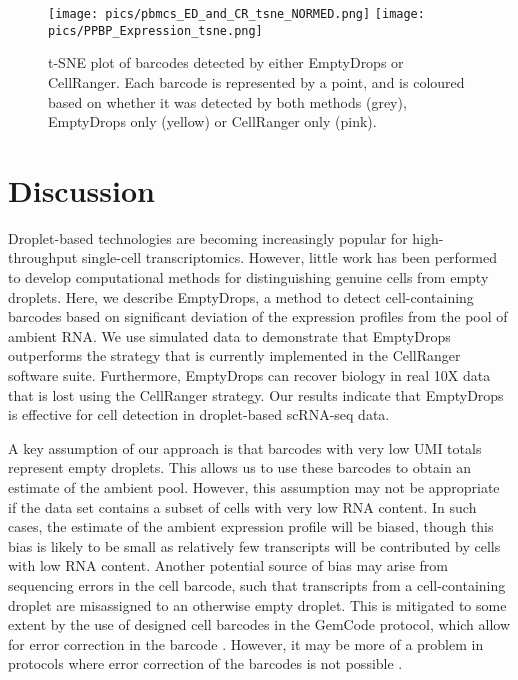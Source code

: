 \documentclass[10pt,letterpaper]{article}
\begin{document}
\begin{figure}
    \begin{center}
        \texttt{[image: pics/pbmcs\_ED\_and\_CR\_tsne\_NORMED.png]}
        \texttt{[image: pics/PPBP\_Expression\_tsne.png]}
    \end{center}
    \caption{t-SNE plot of barcodes detected by either EmptyDrops or CellRanger.
        Each barcode is represented by a point, and is coloured based on whether it was detected by both methods (grey), EmptyDrops only (yellow) or CellRanger only (pink).
    } 
    \label{fig:realtsne}
\end{figure}

\section*{Discussion}
Droplet-based technologies are becoming increasingly popular for high-throughput single-cell transcriptomics.
However, little work has been performed to develop computational methods for distinguishing genuine cells from empty droplets.
Here, we describe EmptyDrops, a method to detect cell-containing barcodes based on significant deviation of the expression profiles from the pool of ambient RNA.
We use simulated data to demonstrate that EmptyDrops outperforms the strategy that is currently implemented in the CellRanger software suite.
Furthermore, EmptyDrops can recover biology in real 10X data that is lost using the CellRanger strategy.
Our results indicate that EmptyDrops is effective for cell detection in droplet-based scRNA-seq data.

A key assumption of our approach is that barcodes with very low UMI totals represent empty droplets.
This allows us to use these barcodes to obtain an estimate of the ambient pool.
However, this assumption may not be appropriate if the data set contains a subset of cells with very low RNA content.
In such cases, the estimate of the ambient expression profile will be biased, though this bias is likely to be small as relatively few transcripts will be contributed by cells with low RNA content.
Another potential source of bias may arise from sequencing errors in the cell barcode, such that transcripts from a cell-containing droplet are misassigned to an otherwise empty droplet.
This is mitigated to some extent by the use of designed cell barcodes in the GemCode protocol, which allow for error correction in the barcode \cite{zheng2017massively}.
However, it may be more of a problem in protocols where error correction of the barcodes is not possible \cite{macosko2015highly}.
\end{document}
